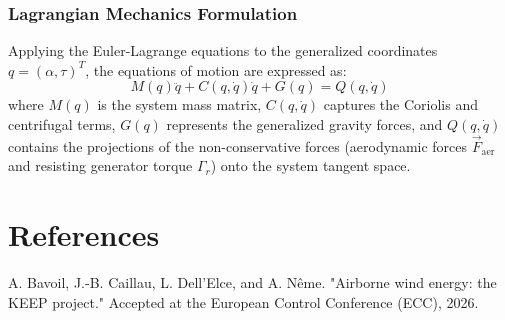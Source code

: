 \documentclass{article}
\begin{document}
\subsubsection{Lagrangian Mechanics Formulation}
Applying the Euler-Lagrange equations to the generalized coordinates $q = (\alpha, \tau)^T$, the equations of motion are expressed as:
\begin{equation}
M(q)\ddot{q} + C(q,\dot{q})\dot{q} + G(q) = Q(q,\dot{q})
\end{equation}
where $M(q)$ is the system mass matrix, $C(q,\dot{q})$ captures the Coriolis and centrifugal terms, $G(q)$ represents the generalized gravity forces, and $Q(q,\dot{q})$ contains the projections of the non-conservative forces (aerodynamic forces $\vec{F}_{\text{aer}}$ and resisting generator torque $\Gamma_r$) onto the system tangent space.

\section*{References}
\noindent [1] A. Bavoil, J.-B. Caillau, L. Dell'Elce, and A. N\^eme. "Airborne wind energy: the KEEP project." Accepted at the European Control Conference (ECC), 2026.
\end{document}
